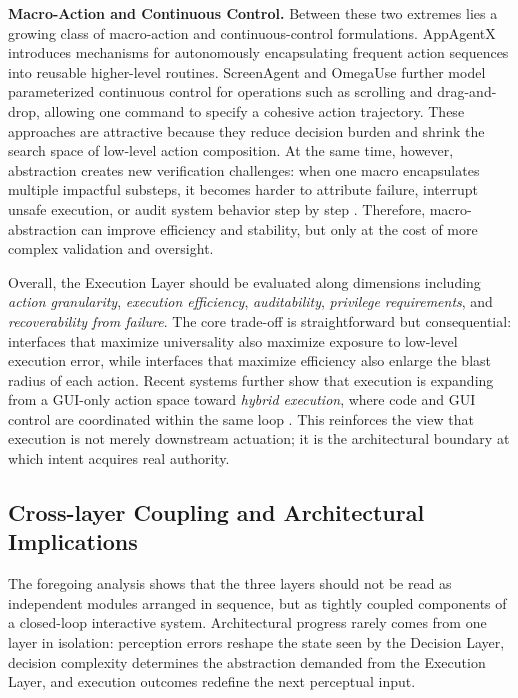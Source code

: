 \textbf{Macro-Action and Continuous Control.}  
Between these two extremes lies a growing class of macro-action and continuous-control formulations. AppAgentX \cite{jiang2025appagentx} introduces mechanisms for autonomously encapsulating frequent action sequences into reusable higher-level routines. ScreenAgent \cite{niu2024screenagent} and OmegaUse \cite{zhang2026omegause} further model parameterized continuous control for operations such as scrolling and drag-and-drop, allowing one command to specify a cohesive action trajectory. These approaches are attractive because they reduce decision burden and shrink the search space of low-level action composition. At the same time, however, abstraction creates new verification challenges: when one macro encapsulates multiple impactful substeps, it becomes harder to attribute failure, interrupt unsafe execution, or audit system behavior step by step \cite{zhang2024agent,miculicich2025veriguard}. Therefore, macro-abstraction can improve efficiency and stability, but only at the cost of more complex validation and oversight.

Overall, the Execution Layer should be evaluated along dimensions including \emph{action granularity}, \emph{execution efficiency}, \emph{auditability}, \emph{privilege requirements}, and \emph{recoverability from failure}. The core trade-off is straightforward but consequential: interfaces that maximize universality also maximize exposure to low-level execution error, while interfaces that maximize efficiency also enlarge the blast radius of each action. Recent systems further show that execution is expanding from a GUI-only action space toward \emph{hybrid execution}, where code and GUI control are coordinated within the same loop \cite{song2025coact}. This reinforces the view that execution is not merely downstream actuation; it is the architectural boundary at which intent acquires real authority.

\subsection{Cross-layer Coupling and Architectural Implications}

The foregoing analysis shows that the three layers should not be read as independent modules arranged in sequence, but as tightly coupled components of a closed-loop interactive system. Architectural progress rarely comes from one layer in isolation: perception errors reshape the state seen by the Decision Layer, decision complexity determines the abstraction demanded from the Execution Layer, and execution outcomes redefine the next perceptual input.

